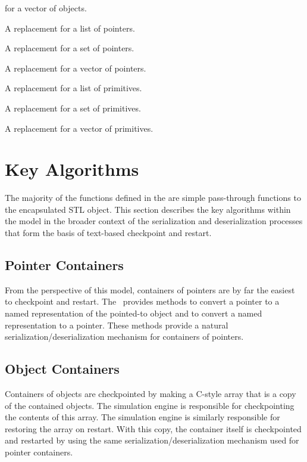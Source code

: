 \begin{description}
  for a vector of objects.
\item[\bf\code{JeodPointerList}] A  replacement
  for a list of pointers.
\item[\bf\code{JeodPointerSet}] A  replacement
  for a set of pointers.
\item[\bf\code{JeodPointerVector}] A  replacement
  for a vector of pointers.
\item[\bf\code{JeodPrimitiveList}] A  replacement
  for a list of primitives.
\item[\bf\code{JeodPrimitiveSet}] A  replacement
  for a set of primitives.
\item[\bf\code{JeodPrimitiveVector}] A  replacement
  for a vector of primitives.
\end{description}

\section{Key Algorithms}
\label{sec:algorithms}
The majority of the functions defined in the \ModelDesc are simple pass-through
functions to the encapsulated STL object. This section describes the
key algorithms within the model in the broader context of the
serialization and deserialization processes that form the basis of
text-based checkpoint and restart.

\subsection{Pointer Containers}
From the perspective of this model, containers of pointers are by far the
easiest to checkpoint and restart. The \SIMINTERFACE\ provides methods
to convert a pointer to a named representation of the pointed-to object and
to convert a named representation to a  pointer. These methods
provide a natural serialization/deserialization mechanism for containers
of pointers.

\subsection{Object Containers}
Containers of objects are checkpointed by making a C-style array that is a
copy of the contained objects. The simulation engine is responsible for
checkpointing the contents of this array. The simulation engine is similarly
responsible for restoring the array on restart. With this copy,
the container itself is checkpointed and restarted by using the same
serialization/deserialization mechanism used for pointer containers.

